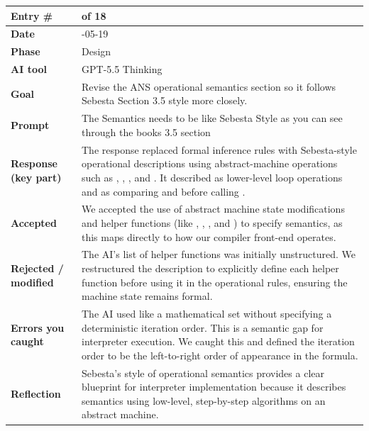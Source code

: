 \documentclass[11pt,a4paper]{article}
\newcommand{\code}[1]{\texttt{\detokenize{#1}}}
\newcommand{\entrygap}{\vspace{8pt}}
\newenvironment{journalentry}{%
  \begin{center}\small\renewcommand{\arraystretch}{1.22}%
  \begin{tabular}{|>{\columncolor{anscodebg}\bfseries}p{3.0cm}|>{\RaggedRight\arraybackslash}p{12.25cm}|}%
  \hline
}{%
  \end{tabular}\end{center}\entrygap
}
\begin{document}
\begin{journalentry}
Entry \# & 14 of 18 \\ \hline
Date & 2026-05-19 \\ \hline
Phase & Design \\ \hline
AI tool & GPT-5.5 Thinking \\ \hline
Goal & Revise the ANS operational semantics section so it follows Sebesta Section 3.5 style more closely. \\ \hline
Prompt & The Semantics needs to be like Sebesta Style as you can see through the books 3.5 section \\ \hline
Response (key part) & The response replaced formal inference rules with Sebesta-style operational descriptions using abstract-machine operations such as \code{evaluate(E)}, \code{formula\_elements(F)}, \code{reaction\_atoms(R)}, and \code{semantic\_error(M)}. It described \code{for (let element in formula)} as lower-level loop operations and \code{check = balanced} as comparing \code{left\_atoms} and \code{right\_atoms} before calling \code{bind\_reaction(N, reaction\_value)}. \\ \hline
Accepted & We accepted the use of abstract machine state modifications and helper functions (like \code{evaluate}, \code{formula\_elements}, \code{reaction\_atoms}, and \code{semantic\_error}) to specify semantics, as this maps directly to how our compiler front-end operates. \\ \hline
Rejected / modified & The AI's list of helper functions was initially unstructured. We restructured the description to explicitly define each helper function before using it in the operational rules, ensuring the machine state remains formal. \\ \hline
Errors you caught & The AI used \code{formula\_elements(F)} like a mathematical set without specifying a deterministic iteration order. This is a semantic gap for interpreter execution. We caught this and defined the iteration order to be the left-to-right order of appearance in the formula. \\ \hline
Reflection & Sebesta's style of operational semantics provides a clear blueprint for interpreter implementation because it describes semantics using low-level, step-by-step algorithms on an abstract machine. \\ \hline
\end{journalentry}
\end{document}
